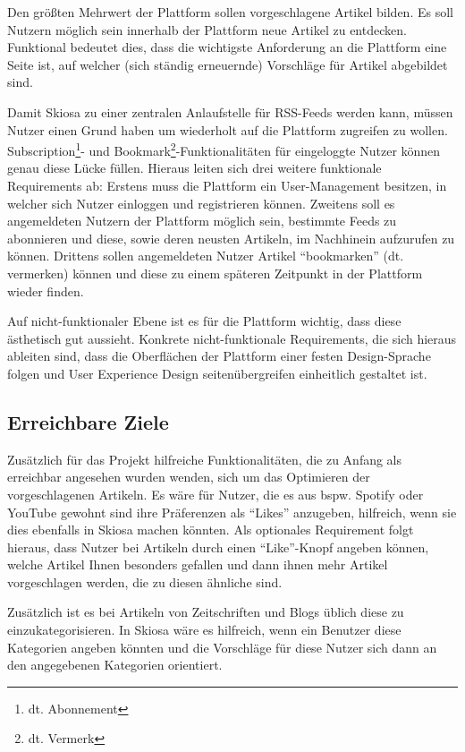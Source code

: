 Den größten Mehrwert der Plattform sollen vorgeschlagene Artikel bilden.
Es soll Nutzern möglich sein innerhalb der Plattform neue Artikel zu entdecken.
Funktional bedeutet dies, dass die wichtigste Anforderung an die Plattform eine Seite ist, auf welcher (sich ständig erneuernde) Vorschläge für Artikel abgebildet sind.

Damit Skiosa zu einer zentralen Anlaufstelle für RSS-Feeds werden kann, müssen Nutzer einen Grund haben um wiederholt auf die Plattform zugreifen zu wollen.
Subscription\footnote{dt. Abonnement}- und Bookmark\footnote{dt. Vermerk}-Funktionalitäten für eingeloggte Nutzer können genau diese Lücke füllen.
Hieraus leiten sich drei weitere funktionale Requirements ab:
Erstens muss die Plattform ein User-Management besitzen, in welcher sich Nutzer einloggen und registrieren können.
Zweitens soll es angemeldeten Nutzern der Plattform möglich sein, bestimmte Feeds zu abonnieren und diese, sowie deren neusten Artikeln, im Nachhinein aufzurufen zu können.
Drittens sollen angemeldeten Nutzer Artikel \enquote{bookmarken} (dt. vermerken) können und diese zu einem späteren Zeitpunkt in der Plattform wieder finden.

Auf nicht-funktionaler Ebene ist es für die Plattform wichtig, dass diese ästhetisch gut aussieht.
Konkrete nicht-funktionale Requirements, die sich hieraus ableiten sind, dass die Oberflächen der Plattform einer festen Design-Sprache folgen und User Experience Design seitenübergreifen einheitlich gestaltet ist.

\subsection{Erreichbare Ziele}
Zusätzlich für das Projekt hilfreiche Funktionalitäten, die zu Anfang als erreichbar angesehen wurden wenden, sich um das Optimieren der vorgeschlagenen Artikeln.
Es wäre für Nutzer, die es aus bspw. Spotify oder YouTube gewohnt sind ihre Präferenzen als \enquote{Likes} anzugeben, hilfreich, wenn sie dies ebenfalls in Skiosa machen könnten.
Als optionales Requirement folgt hieraus, dass Nutzer bei Artikeln durch einen \enquote{Like}-Knopf angeben können, welche Artikel Ihnen besonders gefallen und dann ihnen mehr Artikel vorgeschlagen werden, die zu diesen ähnliche sind.

Zusätzlich ist es bei Artikeln von Zeitschriften und Blogs üblich diese zu einzukategorisieren.
In Skiosa wäre es hilfreich, wenn ein Benutzer diese Kategorien angeben könnten und die Vorschläge für diese Nutzer sich dann an den angegebenen Kategorien orientiert.


